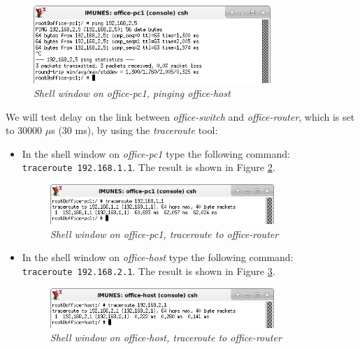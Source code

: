 \begin{itemize}
\begin{figure}[H]
\centering
\vspace{10pt}
\includegraphics[width=0.8\textwidth]{./images/pc_ping.png}
\caption{\emph{Shell window on office-pc1, pinging office-host}}
\label{fig:pc_ping}
\end{figure}

\end{itemize}

We will test delay on the link between \emph{office-switch} and
\emph{office-router}, which is set to 30000 $\mu$s (30 ms), by using the
\emph{traceroute} tool:
\begin{itemize}
\item In the shell window on \emph{office-pc1} type the following command: \\
\texttt{traceroute 192.168.1.1}. The result is shown in Figure
\ref{fig:pc_traceroute}.

\begin{figure}[H]
\centering
\vspace{10pt}
\includegraphics[width=0.8\textwidth]{./images/pc_traceroute.png}
\caption{\emph{Shell window on office-pc1, traceroute to office-router}}
\label{fig:pc_traceroute}
\end{figure}

\item In the shell window on \emph{office-host} type the following command: \\
\texttt{traceroute 192.168.2.1}. The result is shown in Figure
\ref{fig:host_traceroute}.

\begin{figure}[H]
\centering
\vspace{10pt}
\includegraphics[width=0.8\textwidth]{./images/host_traceroute.png}
\caption{\emph{Shell window on office-host, traceroute to office-router}}
\label{fig:host_traceroute}
\end{figure}

\end{itemize}

